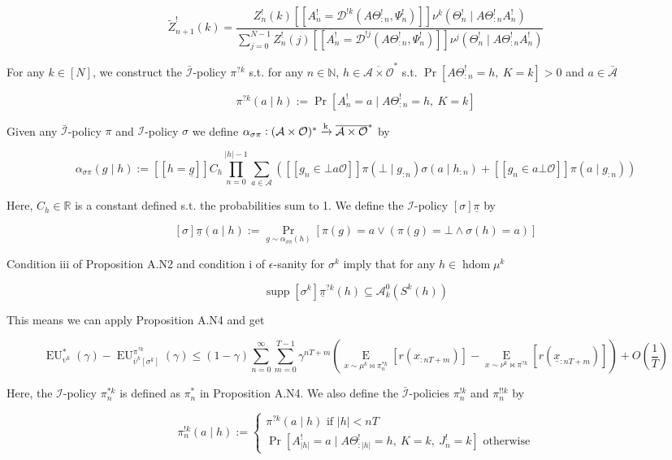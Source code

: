 \documentclass[a4paper]{article}
\DeclareMathOperator{\Supp}{supp}
\newcommand{\E}[1]{\underset{#1}{\operatorname{E}}}
\newcommand{\Nats}{\mathbb{N}}
\newcommand{\Reals}{\mathbb{R}}
\newcommand{\Abs}[1]{\lvert #1 \rvert}
\newcommand{\M}{\xrightarrow{\textnormal{k}}}
\newcommand{\Ob}{\mathcal{O}}
\newcommand{\A}{\mathcal{A}}
\newcommand{\In}{\mathcal{I}}
\newcommand{\FH}{(\A \times \Ob)^*}
\newcommand{\Ada}{\bar{\A}}
\newcommand{\Adi}{{\bar{\In}}}
\newcommand{\Adao}{\overline{\A \times \Ob}}
\newcommand{\Adfh}{\Adao^*}
\DeclareMathOperator{\HD}{hdom}
\newcommand{\EU}{\operatorname{EU}}
\newcommand{\D}{\mathcal{D}}
\newcommand{\Z}{Z}
\newcommand{\J}{J}
\begin{document}
$$\tilde{\Z}^!_{n+1}(k)=\frac{\Z^!_{n}(k) [[A^!_n = \D^{!k}\left(A\Theta^!_{:n}, \Psi^!_n\right)]] \nu^k\left(\Theta^!_{n} \mid A\Theta^!_{:n}A^!_{n}\right)}{\sum_{j = 0}^{N-1} \Z^!_n(j) [[A^!_n = \D^{!j}\left(A\Theta^!_{:n}, \Psi^!_n\right)]] \nu^j(\Theta^!_n \mid A\Theta^!_{:n}A^!_n)}$$

For any $k \in [N]$, we construct the $\Adi$-policy $\pi^{?k}$ s.t. for any $n \in \Nats$, $h \in \Adfh$ s.t. $\Pr\left[A\Theta^!_{:n}=h,\ K = k\right] > 0$ and $a \in \Ada$

$$\pi^{?k}(a \mid h):=\Pr\left[A^!_n = a \mid A\Theta^!_{:n} = h,\ K = k\right]$$

Given any $\Adi$-policy $\pi$ and $\In$-policy $\sigma$ we define $\alpha_{\sigma\pi}: \FH \M \Adfh$ by

$$\alpha_{\sigma\pi} (g \mid h) := [[h = \underline{g}]]C_h\prod_{n = 0}^{\Abs{h}-1} \sum_{a \in \A}\left([[g_n \in \bot a\Ob]] \pi\left(\bot \mid g_{:n}\right)\sigma\left(a \mid h_{:n}\right)+[[g_n \in a\bot\Ob]]\pi\left(a \mid g_{:n}\right)\right)$$

Here, $C_h \in \Reals$ is a constant defined s.t. the probabilities sum to 1. We define the $\In$-policy $\left[\sigma\right]\underline{\pi}$ by

$$\left[\sigma\right]\underline{\pi}(a \mid h):=\Pr_{g \sim \alpha_{\sigma\pi}(h)}\left[\pi\left(g\right)=a \lor \left(\pi\left(g\right)=\bot \land \sigma(h)=a\right)\right]$$

Condition iii of Proposition A.N2 and condition i of $\epsilon$-sanity for $\sigma^k$ imply that for any $h \in \HD{\mu^k}$

$$\Supp{\left[\sigma^k\right]\underline{\pi}^{?k}(h)} \subseteq \A^0_k\left(S^k\left(h\right)\right)$$

This means we can apply Proposition A.N4 and get

$$\EU^*_{\upsilon^k}(\gamma)-\EU^{\pi^{?k}}_{\bar{\upsilon}^k[\sigma^k]}(\gamma) \leq (1-\gamma)\sum_{n=0}^\infty \sum_{m=0}^{T-1} \gamma^{nT+m}\left(\E{x\sim\mu^k\bowtie\pi^{*k}_n}\left[r\left(x_{:nT+m}\right)\right]-\E{x\sim\nu^k\bowtie\pi^{?k}}\left[r\left(\underline{x}_{:nT+m}\right)\right]\right) + O\left(\frac{1}{T}\right)$$

Here, the $\In$-policy $\pi^{*k}_n$ is defined as $\pi^*_n$ in Proposition A.N4. We also define the $\Adi$-policies $\pi^{!k}_n$ and $\pi^{!!k}_n$ by

$$\pi^{!k}_n(a \mid h):=\begin{cases} \pi^{?k}(a \mid h) \text{ if } \Abs{h} < nT \\ \Pr\left[A^!_{\Abs{h}} = a \mid A\Theta^!_{:{\Abs{h}}} = h,\ K = k,\ \J^!_n = k\right] \text{ otherwise} \end{cases}$$
\end{document}
